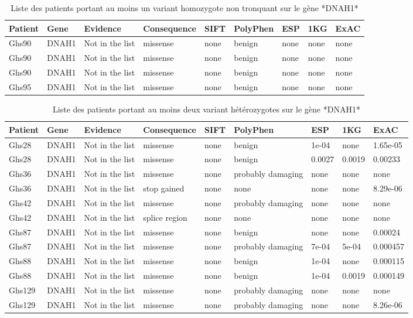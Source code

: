 \documentclass[12pt,twoside]{reedthesis}
\theoremstyle{definition}
\theoremstyle{definition}
\theoremstyle{remark}
\begin{document}
  \begin{longtable}[t]{lllllllll}
  \caption{\label{tab:unnamed-chunk-8}Liste des patients portant au moins un variant homozygote non tronquant sur le gène *DNAH1*}\\
  \toprule
  Patient & Gene & Evidence & Consequence & SIFT & PolyPhen & ESP & 1KG & ExAC\\
  \midrule
  Ghs90 & DNAH1 & Not in the list & missense & none & benign & none & none & none\\
  Ghs90 & DNAH1 & Not in the list & missense & none & benign & none & none & none\\
  Ghs90 & DNAH1 & Not in the list & missense & none & benign & none & none & none\\
  Ghs95 & DNAH1 & Not in the list & missense & none & benign & none & none & none\\
  \bottomrule
  \end{longtable}
  
  \begin{longtable}[t]{lllllllll}
  \caption{\label{tab:unnamed-chunk-9}Liste des patients portant au moins deux variant hétérozygotes sur le gène *DNAH1*}\\
  \toprule
  Patient & Gene & Evidence & Consequence & SIFT & PolyPhen & ESP & 1KG & ExAC\\
  \midrule
  Ghs28 & DNAH1 & Not in the list & missense & none & benign & 1e-04 & none & 1.65e-05\\
  Ghs28 & DNAH1 & Not in the list & missense & none & benign & 0.0027 & 0.0019 & 0.00233\\
  Ghs36 & DNAH1 & Not in the list & missense & none & probably damaging & none & none & none\\
  Ghs36 & DNAH1 & Not in the list & stop gained & none & none & none & none & 8.29e-06\\
  Ghs42 & DNAH1 & Not in the list & missense & none & probably damaging & none & none & none\\
  \addlinespace
  Ghs42 & DNAH1 & Not in the list & splice region & none & none & none & none & none\\
  Ghs87 & DNAH1 & Not in the list & missense & none & benign & none & none & 0.00024\\
  Ghs87 & DNAH1 & Not in the list & missense & none & probably damaging & 7e-04 & 5e-04 & 0.000457\\
  Ghs88 & DNAH1 & Not in the list & missense & none & benign & 1e-04 & none & 0.000115\\
  Ghs88 & DNAH1 & Not in the list & missense & none & benign & 1e-04 & 0.0019 & 0.000149\\
  \addlinespace
  Ghs129 & DNAH1 & Not in the list & missense & none & probably damaging & none & none & none\\
  Ghs129 & DNAH1 & Not in the list & missense & none & probably damaging & none & none & 8.26e-06\\
  \bottomrule
  \end{longtable}
  
\end{document}
